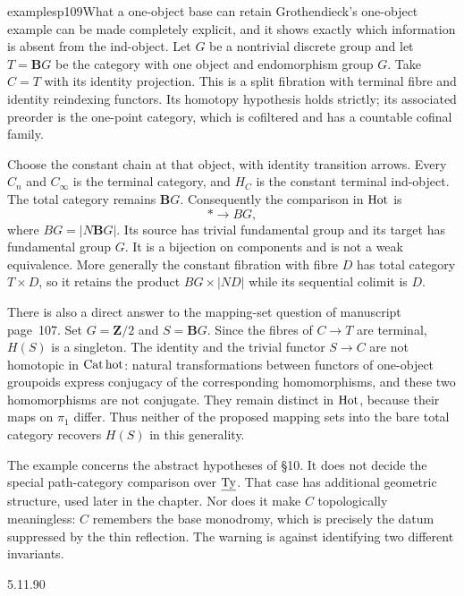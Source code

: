 \begin{dcomment}{examples}{p109}{What a one-object base can retain}
Grothendieck's one-object example can be made completely explicit, and it shows exactly which information is absent from the ind-object. Let $G$ be a nontrivial discrete group and let $T=\mathbf BG$ be the category with one object and endomorphism group $G$. Take $C=T$ with its identity projection. This is a split fibration with terminal fibre and identity reindexing functors. Its homotopy hypothesis holds strictly; its associated preorder is the one-point category, which is cofiltered and has a countable cofinal family.

Choose the constant chain at that object, with identity transition arrows. Every $C_n$ and $C_\infty$ is the terminal category, and $H_C$ is the constant terminal ind-object. The total category remains $\mathbf BG$. Consequently the comparison in $\mathrm{Hot}$ is
\[
 *\longrightarrow BG,
\]
where $BG=|N\mathbf BG|$. Its source has trivial fundamental group and its target has fundamental group $G$. It is a bijection on components and is not a weak equivalence. More generally the constant fibration with fibre $D$ has total category $T\times D$, so it retains the product $BG\times|ND|$ while its sequential colimit is $D$.

There is also a direct answer to the mapping-set question of manuscript page~107. Set $G=\mathbf Z/2$ and $S=\mathbf BG$. Since the fibres of $C\to T$ are terminal, $H(S)$ is a singleton. The identity and the trivial functor $S\to C$ are not homotopic in $\mathrm{Cat\,hot}$: natural transformations between functors of one-object groupoids express conjugacy of the corresponding homomorphisms, and these two homomorphisms are not conjugate. They remain distinct in $\mathrm{Hot}$, because their maps on $\pi_1$ differ. Thus neither of the proposed mapping sets into the bare total category recovers $H(S)$ in this generality.

The example concerns the abstract hypotheses of \S10. It does not decide the special path-category comparison over $\underline{\mathrm{Ty}}$. That case has additional geometric structure, used later in the chapter. Nor does it make $C$ topologically meaningless: $C$ remembers the base monodromy, which is precisely the datum suppressed by the thin reflection. The warning is against identifying two different invariants.
\end{dcomment}


\begin{flushright}
{\footnotesize 5.11.90}
\end{flushright}


